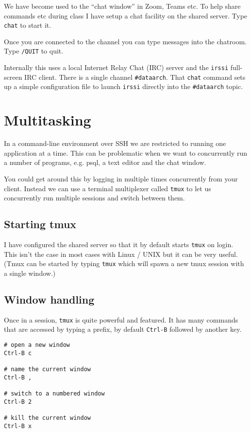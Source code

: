 We have become used to the ``chat window'' in Zoom, Teams etc.
To help share commands etc during class I have setup a chat facility on the shared server.
Type \texttt{chat} to start it.

Once you are connected to the channel you can type messages into the chatroom.
Type \texttt{/QUIT} to quit.

Internally this uses a local Internet Relay Chat (IRC) server and the \texttt{irssi} full-screen IRC client.
There is a single channel \texttt{\#dataarch}. 
That \texttt{chat} command sets up a simple configuration file to launch \texttt{irssi} directly into the \texttt{\#dataarch} topic. 

\section{Multitasking}

In a command-line environment over SSH we are restricted to running one application at a time.
This can be problematic when we want to concurrently run a number of programs, e.g. psql, a text editor and the chat window. 

You could get around this by logging in multiple times concurrently from your client.
Instead we can use a terminal multiplexer called \texttt{tmux} to let us concurrently run multiple sessions and switch between them.

\subsection{Starting tmux}

I have configured the shared server so that it by default starts \texttt{tmux} on login.
This isn't the case in most cases with Linux / UNIX but it can be very useful.
(Tmux can be started by typing \texttt{tmux} which will spawn a new tmux session with a single window.)

\subsection{Window handling}

Once in a session, \texttt{tmux} is quite powerful and featured.
It has many commands that are accessed by typing a prefix, by default \texttt{Ctrl-B} followed by another key.

\begin{verbatim}
# open a new window
Ctrl-B c

# name the current window
Ctrl-B , 

# switch to a numbered window 
Ctrl-B 2

# kill the current window
Ctrl-B x 
\end{verbatim}


